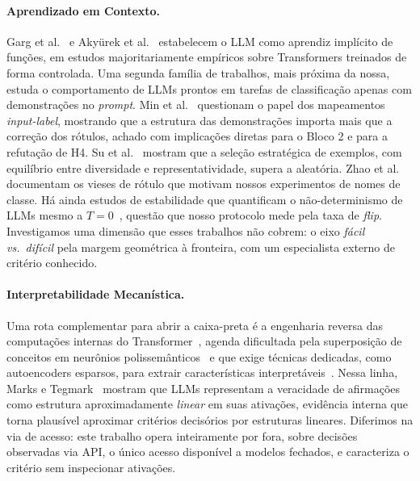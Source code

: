 \documentclass[12pt,a4paper]{article}
\begin{document}
\paragraph{Aprendizado em Contexto.}
Garg et al.~\cite{gargWhatTransformers2022} e Akyürek et al.~\cite{akyurekWhatLearning2023}
estabelecem o LLM como aprendiz implícito de funções, em estudos majoritariamente
empíricos sobre Transformers treinados de forma controlada. Uma segunda família de
trabalhos, mais próxima da nossa, estuda o comportamento de LLMs prontos em tarefas de
classificação apenas com demonstrações no \emph{prompt}. Min et
al.~\cite{minRethinkingRole2022} questionam o papel dos mapeamentos \emph{input-label},
mostrando que a estrutura das demonstrações importa mais que a correção dos rótulos, achado
com implicações diretas para o Bloco 2 e para a refutação de H4. Su et
al.~\cite{suSelectiveAnnotation2023} mostram que a seleção estratégica de exemplos, com
equilíbrio entre diversidade e representatividade, supera a aleatória. Zhao et
al.~\cite{zhaoCalibrateBefore2021} documentam os vieses de rótulo que motivam nossos
experimentos de nomes de classe. Há ainda estudos de estabilidade que quantificam o
não-determinismo de LLMs mesmo a $T=0$~\cite{atilLLMStability2024, windischOneRun2026},
questão que nosso protocolo mede pela taxa de \emph{flip}. Investigamos uma
dimensão que esses trabalhos não cobrem: o eixo \emph{fácil vs.\ difícil} pela margem
geométrica à fronteira, com um especialista externo de critério conhecido.

\paragraph{Interpretabilidade Mecanística.}
Uma rota complementar para abrir a caixa-preta é a engenharia reversa das computações
internas do Transformer~\cite{elhageMathematicalFramework2021}, agenda dificultada pela
superposição de conceitos em neurônios polissemânticos~\cite{elhageToyModels2022} e que
exige técnicas dedicadas, como autoencoders esparsos, para extrair características
interpretáveis~\cite{brickenMonosemanticity2023}. Nessa linha, Marks e
Tegmark~\cite{marksGeometryTruth2024} mostram que LLMs representam a veracidade de
afirmações como estrutura aproximadamente \emph{linear} em suas ativações, evidência
interna que torna plausível aproximar critérios decisórios por estruturas lineares.
Diferimos na via de acesso: este trabalho opera inteiramente por fora, sobre decisões
observadas via API, o único acesso disponível a modelos fechados, e caracteriza o critério
sem inspecionar ativações.
\end{document}
